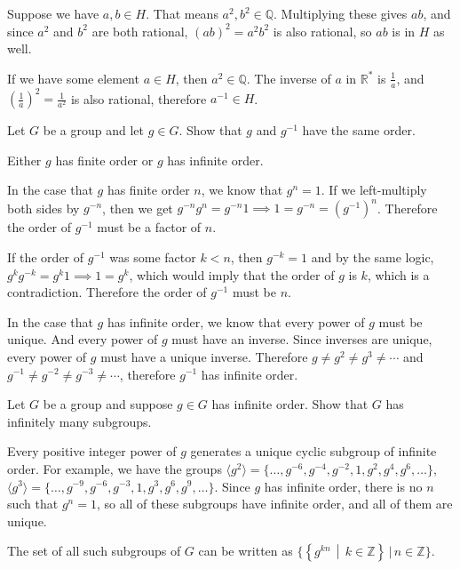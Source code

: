 \documentclass[a4paper]{article}
\begin{document}
Suppose we have $a, b \in H$. That means $a^2, b^2 \in \mathbb Q$. Multiplying these gives $ab$, and since $a^2$ and $b^2$ are both rational, $(ab)^2 = a^2 b^2$ is also rational, so $ab$ is in $H$ as well.

If we have some element $a \in H$, then $a^2 \in \mathbb Q$. The inverse of $a$ in $\mathbb R^*$ is $\frac1a$, and $\left(\frac1a\right)^2 = \frac1{a^2}$ is also rational, therefore $a^{-1} \in H$.


\begin{questionbody}
Let $G$ be a group and let $g \in G$. Show that $g$ and $g^{-1}$ have the same order.
\end{questionbody}

Either $g$ has finite order or $g$ has infinite order.

In the case that $g$ has finite order $n$, we know that $g^n = 1$. If we left-multiply both sides by $g^{-n}$, then we get $g^{-n} g^n = g^{-n} 1 \implies 1 = g^{-n} = \left(g^{-1}\right)^n$. Therefore the order of $g^{-1}$ must be a factor of $n$.

If the order of $g^{-1}$ was some factor $k < n$, then $g^{-k} = 1$ and by the same logic, $g^k g^{-k} = g^k 1 \implies 1 = g^k$, which would imply that the order of $g$ is $k$, which is a contradiction. Therefore the order of $g^{-1}$ must be $n$.

In the case that $g$ has infinite order, we know that every power of $g$ must be unique. And every power of $g$ must have an inverse. Since inverses are unique, every power of $g$ must have a unique inverse. Therefore $g \ne g^2 \ne g^3 \ne \cdots$ and $g^{-1} \ne g^{-2} \ne g^{-3} \ne \cdots$, therefore $g^{-1}$ has infinite order.


\begin{questionbody}
Let $G$ be a group and suppose $g \in G$ has infinite order. Show that $G$ has infinitely many subgroups.
\end{questionbody}

Every positive integer power of $g$ generates a unique cyclic subgroup of infinite order. For example, we have the groups $\langle g^2 \rangle = \{\ldots, g^{-6}, g^{-4}, g^{-2}, 1, g^2, g^4, g^6, \ldots\}$, $\langle g^3 \rangle = \{\ldots, g^{-9}, g^{-6}, g^{-3}, 1, g^3, g^6, g^9, \ldots\}$. Since $g$ has infinite order, there is no $n$ such that $g^n = 1$, so all of these subgroups have infinite order, and all of them are unique.

The set of all such subgroups of $G$ can be written as $\Big\{ \left\{g^{kn} \,\middle|\, k \in \mathbb Z\right\} \,\Big|\, n \in \mathbb Z \Big\}$.
\end{document}
